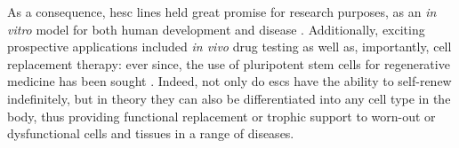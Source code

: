 




As a consequence, \gls{hesc} lines held great promise for research purposes, as an \textit{in vitro} model for both human development and disease \cite{saha2009technical}.
Additionally, exciting prospective applications included \textit{in vivo} drug testing as well as, importantly, cell replacement therapy: ever since, the use of pluripotent stem cells for regenerative medicine has been sought \cite{kimbrel2015current}.
Indeed, not only do \glspl{esc} have the ability to self-renew indefinitely, but in theory they can also be differentiated into any cell type in the body, thus providing functional replacement or trophic support to worn-out or dysfunctional cells and tissues in a range of diseases. \\


